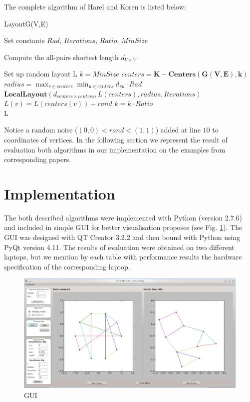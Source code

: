 \documentclass[12pt,a4paper]{article}
\begin{document}
\FloatBarrier 

The complete algorithm of Harel and Koren is listed below:

\begin{algorithm}
\caption{LayoutG(V,E) \cite{DavidHarel2002}}
\label{HK}
\begin{algorithmic}[1]
\item Set constants $Rad$, $Iterations$, $Ratio$, $MinSize$
\item Compute the all-pairs shortest length $d_{V\times V}$
\item Set up random layout L
\State $ k = MinSize $
	\State $ centers =  \mathbf{K-Centers(G(V,E),k)} $
	\State $ radius =  \max_{v\in centers}\min_{u\in centers}d_{vu} \cdot Rad $	
	\State $\mathbf{LocalLayout}(d_{centers\times centers}, L(centers), radius, Iterations)$
		\State $L(v)=L(centers(v))+rand$
	\EndFor
	\State $k = k \cdot Ratio$
\EndWhile \\
\Return L
\end{algorithmic}
\end{algorithm}

Notice a random noise ($(0,0)<rand<(1,1)$) added at line $10$ to coordinates of vertices.
In the following section we represent the result of evaluation both algorithms in our implementation on the examples from corresponding papers.

\section{Implementation}
The both described algorithms were implemented with Python (version 2.7.6) and included in simple GUI for better visualisation proposes (see Fig. \ref{fig: 0}). The GUI was designed with QT Creator 3.2.2 and then bound with Python using PyQt version 4.11. The results of evaluation were obtained on two different laptops, but we mention by each table with performance results the hardware specification of the corresponding laptop.

\begin{figure}
	\centering
	\includegraphics[scale=0.4]{interface.png}
	\caption{GUI}\label{fig: 0}
\end{figure}
\end{document}
